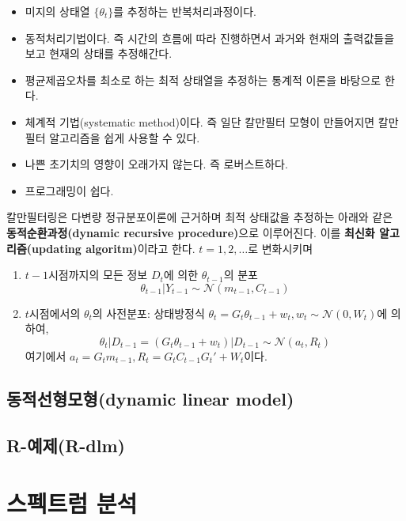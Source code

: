 \documentclass[b5paper,]{scrbook}
\theoremstyle{plain}
\theoremstyle{definition}
\numberwithin{equation}{section}
\begin{document}
\begin{itemize}
\item
  미지의 상태열 \(\{\theta_{t}\}\)를 추정하는 반복처리과정이다.
\item
  동적처리기법이다. 즉 시간의 흐름에 따라 진행하면서 과거와 현재의 출력값들을 보고 현재의 상태를 추정해간다.
\item
  평균제곱오차를 최소로 하는 최적 상태열을 추정하는 통계적 이론을 바탕으로 한다.
\item
  체계적 기법(systematic method)이다. 즉 일단 칼만필터 모형이 만들어지면 칼만필터 알고리즘을 쉽게 사용할 수 있다.
\item
  나쁜 초기치의 영향이 오래가지 않는다. 즉 로버스트하다.
\item
  프로그래밍이 쉽다.
\end{itemize}

칼만필터링은 다변량 정규분포이론에 근거하며 최적 상태값을 추정하는 아래와 같은 \textbf{동적순환과정(dynamic recursive procedure)}으로 이루어진다. 이를 \textbf{최신화 알고리즘(updating algoritm)}이라고 한다. \(t=1,2,\ldots\)로 변화시키며

\begin{enumerate}
\def\labelenumi{\arabic{enumi}.}
\item
  \(t-1\)시점까지의 모든 정보 \(D_{t}\)에 의한 \(\theta_{t-1}\)의 분포
  \[\theta_{t-1}|Y_{t-1} \sim \mathcal{N}(m_{t-1},C_{t-1})\]
\item
  \(t\)시점에서의 \(\theta_{t}\)의 사전분포: 상태방정식 \(\theta_{t}=G_{t}\theta_{t-1}+w_{t}, w_{t} \sim \mathcal{N}(0,W_{t})\)에 의하여,
  \[\theta_{t}|D_{t-1} = (G_{t}\theta_{t-1}+w_{t})|D_{t-1}\sim \mathcal{N}(a_{t},R_{t})\]
  여기에서 \(a_{t}=G_{t}m_{t-1}, R_{t}=G_{t}C_{t-1}G_{t}'+W_{t}\)이다.
\end{enumerate}

\hypertarget{dynamic-linear-model}{%
\section{동적선형모형(dynamic linear model)}\label{dynamic-linear-model}}

\hypertarget{r-r-dlm}{%
\section{R-예제(R-dlm)}\label{r-r-dlm}}

\hypertarget{spectral}{%
\chapter{스펙트럼 분석}\label{spectral}}
\end{document}
